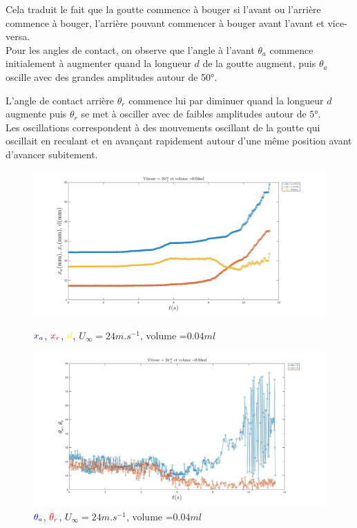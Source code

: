 \documentclass[french]{article}
\begin{document}
Cela traduit le fait que la goutte commence à bouger si l'avant ou l'arrière commence à bouger, l'arrière pouvant commencer à bouger avant l'avant et vice-versa.\\

Pour les angles de contact, on observe que l'angle à l'avant $\theta_{a}$ commence initialement à augmenter quand la longueur $d$ de la goutte augment, puis $\theta_{a}$ oscille avec des grandes amplitudes autour de \ang{50}.

L'angle de contact arrière $\theta_{r}$ commence lui par diminuer quand la longueur $d$ augmente puis $\theta_{r}$ se met à osciller avec de faibles amplitudes autour de $\ang{5}$.\\

Les oscillations correspondent à des mouvements oscillant de la goutte qui oscillait en reculant et en avançant rapidement autour d'une même position avant d'avancer subitement.

\newpage
\begin{figure}[!ht]
	\centering
	\begin{minipage}{0.7\linewidth}
		\includegraphics[width=\linewidth]{./image/v=24_vol=004_xaxrd.jpg}
		\caption{$\textcolor{blue}{x_{a}}$,
		$\textcolor{red}{x_{r}}$, $\textcolor{yellow}{d}$, 
		$U_{\infty}=24m.s^{-1}$, volume =$0.04ml$}
		\label{fig:entre_xaxrd}
	\end{minipage}
	\vfill
	\begin{minipage}{0.7\linewidth}
		\includegraphics[width=\linewidth]{./image/v=24_vol=004_oaor.jpg}
		\caption{$\textcolor{blue}{\theta_{a}}$,
		$\textcolor{red}{\theta_{r}}$, $U_{\infty}=24m.s^{-1}$, volume =$0.04ml$}
		\label{fig:entre_oaor}
	\end{minipage}
 \end{figure}
\end{document}
